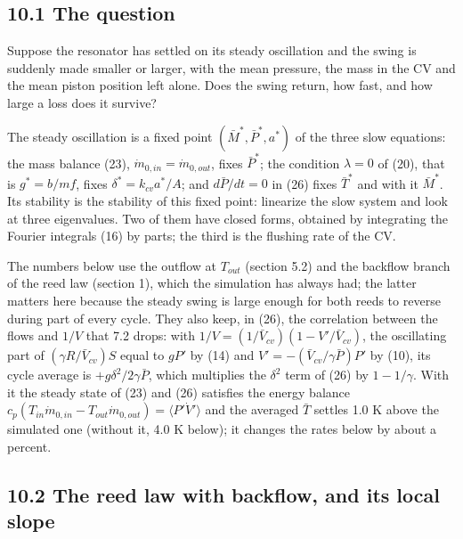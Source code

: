 \documentclass[11pt]{article}
\begin{document}
\subsection*{10.1 The question}

Suppose the resonator has settled on its steady oscillation and the swing is suddenly made smaller or larger, with the mean pressure, the mass in the CV and the mean piston position left alone. Does the swing return, how fast, and how large a loss does it survive?

The steady oscillation is a fixed point $(\bar M^*, \bar P^*, a^*)$ of the three slow equations: the mass balance (23), $\dot m_{0,in} = \dot m_{0,out}$, fixes $\bar P^*$; the condition $\lambda = 0$ of (20), that is $g^* = b/mf$, fixes $\delta^* = k_{cv}a^*/A$; and $d\bar P/dt = 0$ in (26) fixes $\bar T^*$ and with it $\bar M^*$. Its stability is the stability of this fixed point: linearize the slow system and look at three eigenvalues. Two of them have closed forms, obtained by integrating the Fourier integrals (16) by parts; the third is the flushing rate of the CV.

The numbers below use the outflow at $T_{out}$ (section 5.2) and the backflow branch of the reed law (section 1), which the simulation has always had; the latter matters here because the steady swing is large enough for both reeds to reverse during part of every cycle. They also keep, in (26), the correlation between the flows and $1/V$ that 7.2 drops: with $1/V = (1/\bar V_{cv})(1 - V'/\bar V_{cv})$, the oscillating part of $(\gamma R/\bar V_{cv})S$ equal to $gP'$ by (14) and $V' = -(\bar V_{cv}/\gamma\bar P)P'$ by (10), its cycle average is $+g\delta^2/2\gamma\bar P$, which multiplies the $\delta^2$ term of (26) by $1 - 1/\gamma$. With it the steady state of (23) and (26) satisfies the energy balance $c_p(T_{in}\dot m_{0,in} - T_{out}\dot m_{0,out}) = \langle P'\dot V'\rangle$ and the averaged $\bar T$ settles 1.0 K above the simulated one (without it, 4.0 K below); it changes the rates below by about a percent.

\subsection*{10.2 The reed law with backflow, and its local slope}
\end{document}

